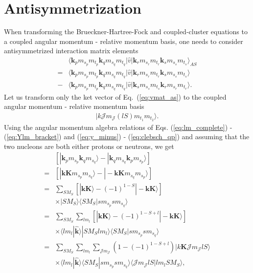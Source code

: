 \documentclass[a4paper,12pt]{report}
\begin{document}
\section{Antisymmetrization}
When transforming the Brueckner-Hartree-Fock and coupled-cluster equations to a coupled angular momentum - relative momentum basis, one needs to consider antisymmetrized interaction matrix elements
\begin{align}
  &\langle \mathbf{k}_{p}m_{s_{p}}m_{t_{p}}\mathbf{k}_{q}m_{s_{q}}m_{t_{q}}|\hat{v}|\mathbf{k}_{r}m_{s_{r}}m_{t_{r}}\mathbf{k}_{s}m_{s_{s}}m_{t_{s}}\rangle_{AS} \nonumber \\
  = &\langle \mathbf{k}_{p}m_{s_{p}}m_{t_{p}}\mathbf{k}_{q}m_{s_{q}}m_{t_{q}}|\hat{v}|\mathbf{k}_{r}m_{s_{r}}m_{t_{r}}\mathbf{k}_{s}m_{s_{s}}m_{t_{s}}\rangle \nonumber \\
  - &\langle \mathbf{k}_{p}m_{s_{p}}m_{t_{p}}\mathbf{k}_{q}m_{s_{q}}m_{t_{q}}|\hat{v}|\mathbf{k}_{s}m_{s_{s}}m_{t_{s}}\mathbf{k}_{r}m_{s_{r}}m_{t_{r}}\rangle .
  \label{eq:vmat_as}
\end{align}
Let us transform only the ket vector of Eq.~(\ref{eq:vmat_as}) to the coupled angular momentum - relative momentum basis 
\begin{align}
  |k\mathcal{J}m_{\mathcal{J}}(lS)m_{t_{1}}m_{t_{2}}\rangle. \nonumber
  \label{eq:pw_basis_app}
\end{align}
Using the angular momentum algebra relations of Eqs. (\ref{eq:lm_complete}) - (\ref{eq:Ylm_bracket}) and (\ref{eq:y_minus}) - (\ref{eq:clebsch_qp}) and assuming that the two nucleons are both either protons or neutrons, we get
\begin{align}
  &\left[ |\mathbf{k}_{p}m_{s_{p}}\mathbf{k}_{q}m_{s_{q}}\rangle - |\mathbf{k}_{q}m_{s_{q}}\mathbf{k}_{p}m_{s_{p}}\rangle \right] \nonumber \\
  = &\left[ |\mathbf{k}\mathbf{K}m_{s_{p}}m_{s_{q}}\rangle - |-\mathbf{k}\mathbf{K}m_{s_{q}}m_{s_{p}}\rangle \right] \nonumber \\
  = &\sum_{SM_{S}} \left[ |\mathbf{k}\mathbf{K}\rangle - (-1)^{1-S}|-\mathbf{k}\mathbf{K}\rangle \right] \nonumber \\
  & \times |SM_{S}\rangle \langle SM_{S}|sm_{s_{p}}sm_{s_{q}}\rangle \nonumber \\
  = &\sum_{SM_{S}}\sum_{lm_{l}} \left[ |\mathbf{k}\mathbf{K}\rangle  - (-1)^{1-S+l}|-\mathbf{k}\mathbf{K}\rangle \right] \nonumber \\
  & \times \langle lm_{l}|\mathbf{\hat{k}}\rangle |SM_{S}lm_{l}\rangle \langle SM_{S}|sm_{s_{p}}sm_{s_{q}}\rangle \nonumber \\ 
  = & \sum_{SM_{S}}\sum_{lm_{l}}\sum_{\mathcal{J}m_{\mathcal{J}}} (1-(-1)^{1-S+l}) |k\mathbf{K}\mathcal{J}m_{\mathcal{J}}lS\rangle \nonumber \\
  & \times \langle lm_{l}|\mathbf{\hat{k}}\rangle \langle SM_{S}|sm_{s_{p}}sm_{s_{q}}\rangle \langle \mathcal{J}m_{\mathcal{J}}lS|lm_{l}SM_{S}\rangle ,
\end{align}
\end{document}

